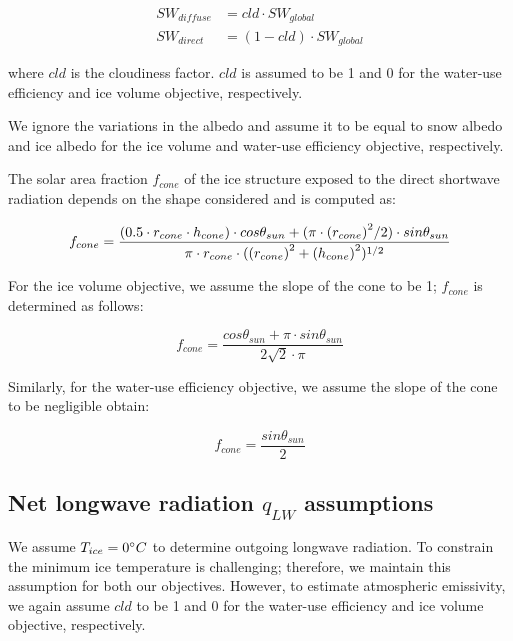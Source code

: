 \documentclass[tc, manuscript]{copernicus}
\begin{document}
\begin{equation}
\begin{split}
  SW_{diffuse} &= cld \cdot SW_{global}\\
  SW_{direct} &= (1-cld) \cdot SW_{global}
\end{split}
\end{equation}

where $cld$ is the cloudiness factor. $cld$ is assumed to be 1 and 0 for the water-use efficiency and ice volume
objective, respectively.

We ignore the variations in the albedo and assume it to be equal to snow albedo and ice albedo for the ice
volume and water-use efficiency objective, respectively.

The solar area fraction $f_{cone}$ of the ice structure exposed to the direct shortwave radiation depends on the
shape considered and is computed as:

\begin{equation}
		f_{cone} =\frac{(0.5 \cdot r_{cone} \cdot h_{cone}) \cdot cos \theta_{sun} +(\pi \cdot
			{(r_{cone})}^2/2) \cdot sin \theta_{sun} }{\pi \cdot r_{cone} \cdot ({(r_{cone})}^2+{(h_{cone})}^2)^{1/2}}\\
\end{equation}

For the ice volume objective, we assume the slope of the cone to be 1; $f_{cone}$ is determined as follows:

\begin{equation}
		f_{cone} =\frac{ cos \theta_{sun} + \pi \cdot sin \theta_{sun} }{2\sqrt{2} \cdot \pi }
\end{equation}

Similarly, for the water-use efficiency objective, we assume the slope of the cone to be negligible obtain:

\begin{equation}
		f_{cone} =\frac{ sin \theta_{sun} }{2 }
\end{equation}

\subsection{Net longwave radiation \texorpdfstring{$q_{LW}$}{Lg} assumptions} 

We assume $T_{ice} = 0 ^{\circ} C$ to determine outgoing longwave radiation. To
constrain the minimum ice temperature is challenging; therefore, we maintain this assumption for both our objectives. However, to
estimate atmospheric emissivity, we again assume $cld$ to be 1 and 0 for the water-use efficiency and ice volume
objective, respectively.
\end{document}
